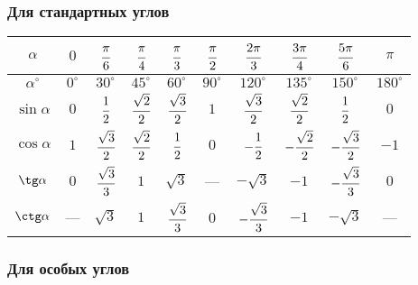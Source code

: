 \subsubsection{Для стандартных углов}

\begin{tabu}[t]{||c|c|c|c|c|c|c|c|c|c||}
	\hline
		$ \alpha $ &
		$ 0 $ &
		$ \cfrac{\pi}{6} $ &
		$ \cfrac{\pi}{4} $ &
		$ \cfrac{\pi}{3} $ &
		$ \cfrac{\pi}{2} $ &
		$ \cfrac{2\pi}{3} $ &
		$ \cfrac{3\pi}{4} $ &
		$ \cfrac{5\pi}{6} $ &
		$ \pi $ \\
	\hline
		$ \alpha^{\circ} $ &
		$ 0^{\circ} $ &
		$ 30^{\circ} $ &
		$ 45^{\circ} $ &
		$ 60^{\circ} $ &
		$ 90^{\circ} $ &
		$ 120^{\circ} $ &
		$ 135^{\circ} $ &
		$ 150^{\circ} $ & 
		$ 180^{\circ} $ \\
	\hline
		$ \sin \alpha $ & 	$ 0 $ & 	$ \cfrac{1}{2} $ & 	$ \cfrac{\sqrt{2}}{2} $ & 	$ \cfrac{\sqrt{3}}{2} $ & 	$ 1 $ & 	$ \cfrac{\sqrt{3}}{2} $ & 	$ \cfrac{\sqrt{2}}{2} $ & 	$ \cfrac{1}{2} $ & $ 0 $ \\
	\hline
		$ \cos \alpha $ & 	$ 1 $ & 	$ \cfrac{\sqrt{3}}{2} $ & 	$ \cfrac{\sqrt{2}}{2} $ & 	$ \cfrac{1}{2} $ & 	$ 0 $ & 	$ -\cfrac{1}{2} $ & 	$ -\cfrac{\sqrt{2}}{2} $ & 	$ -\cfrac{\sqrt{3}}{2} $ & $ -1 $ \\
	\hline
		$ \tg \alpha $ & 	$ 0 $ & 	$ \cfrac{\sqrt{3}}{3} $ & 	$ 1 $ & 	$ \sqrt{3} $ & 	--- & 	$ -\sqrt{3} $ & 	$ -1 $ & 	$ -\cfrac{\sqrt{3}}{3} $ & $ 0 $ \\
	\hline
		$ \ctg \alpha $ & 	--- & 	$ \sqrt{3} $ & 	$ 1 $ & 	$ \cfrac{\sqrt{3}}{3} $ & 	0 & 	$ -\cfrac{\sqrt{3}}{3} $ & 	$ -1 $ & 	$ -\sqrt{3} $ & --- \\
	\hline
\end{tabu}

\subsubsection{Для особых углов}

